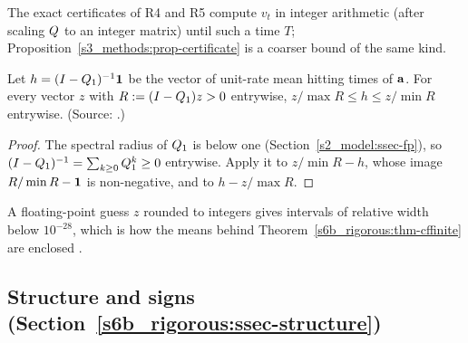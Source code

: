 The exact certificates of R4 and R5 compute $v_t$ in integer arithmetic (after scaling $Q$ to an integer matrix)
until such a time $T$; Proposition~\ref{s3_methods:prop-certificate} is a coarser bound of the same kind.

\begin{lemma}\label{appD_rigorous:lem-encl}
Let $h=(I-Q_1)^{-1}\mathbf{1}$ be the vector of unit-rate mean hitting times of $\mathbf{a}$. For every vector $z$ with
$R:=(I-Q_1)z>0$ entrywise, $z/\max R\le h\le z/\min R$ entrywise.
\textup{(Source: .)}
\end{lemma}

\begin{proof}
The spectral radius of $Q_1$ is below one (Section~\ref{s2_model:ssec-fp}), so
$(I-Q_1)^{-1}=\sum_{k\ge0}Q_1^{k}\ge0$ entrywise. Apply it to $z/\min R-h$, whose image
$R/\min R-\mathbf{1}$ is non-negative, and to $h-z/\max R$.
\end{proof}

A floating-point guess $z$ rounded to integers gives intervals of relative width below $10^{-28}$, which is how the
means behind Theorem~\ref{s6b_rigorous:thm-cffinite} are enclosed .

\subsection{Structure and signs (Section~\ref{s6b_rigorous:ssec-structure})}

